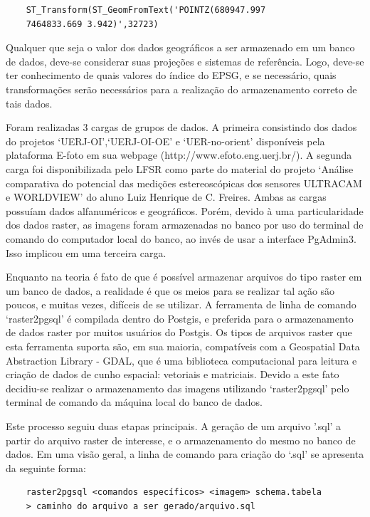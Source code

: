 \begin{verbatim}
    ST_Transform(ST_GeomFromText('POINTZ(680947.997
    7464833.669 3.942)',32723)
\end{verbatim}

Qualquer que seja o valor dos dados geográficos a ser armazenado em um banco de dados, deve-se considerar suas projeções e sistemas de referência. Logo, deve-se ter conhecimento de quais valores do índice do EPSG, e se necessário, quais transformações serão necessários para a realização do armazenamento correto de tais dados.

Foram realizadas 3 cargas de grupos de dados. A primeira consistindo dos dados do projetos `UERJ-OI',`UERJ-OI-OE' e `UER-no-orient' disponíveis pela plataforma E-foto em sua webpage (http://www.efoto.eng.uerj.br/). A segunda carga foi disponibilizada pelo LFSR como parte do material do projeto `Análise comparativa do potencial das medições estereoscópicas dos sensores ULTRACAM e WORLDVIEW' do aluno Luiz Henrique de C. Freires. Ambas as cargas possuíam dados alfanuméricos e geográficos. Porém, devido à uma particularidade dos dados raster, as imagens foram armazenadas no banco por uso do terminal de comando do computador local do banco, ao invés de usar a interface PgAdmin3. Isso implicou em uma terceira carga.

Enquanto na teoria é fato de que é possível armazenar arquivos do tipo raster em um banco de dados, a realidade é que os meios para se realizar tal ação são poucos, e muitas vezes, difíceis de se utilizar. A ferramenta de linha de comando `raster2pgsql' é compilada dentro do Postgis, e preferida para o armazenamento de dados raster por muitos usuários do Postgis. Os tipos de arquivos raster que esta ferramenta suporta são, em sua maioria, compatíveis com a Geospatial Data Abstraction Library - GDAL, que é uma biblioteca computacional para leitura e criação de dados de cunho espacial: vetoriais e matriciais.
Devido a este fato decidiu-se realizar o armazenamento das imagens utilizando `raster2pgsql' pelo terminal de comando da máquina local do banco de dados.

Este processo seguiu duas etapas principais. A geração de um arquivo '.sql' a partir do arquivo raster de interesse, e o armazenamento do mesmo no banco de dados. Em uma visão geral, a linha de comando para criação do `.sql' se apresenta da seguinte forma:

\begin{verbatim}
    raster2pgsql <comandos específicos> <imagem> schema.tabela 
    > caminho do arquivo a ser gerado/arquivo.sql
\end{verbatim}

